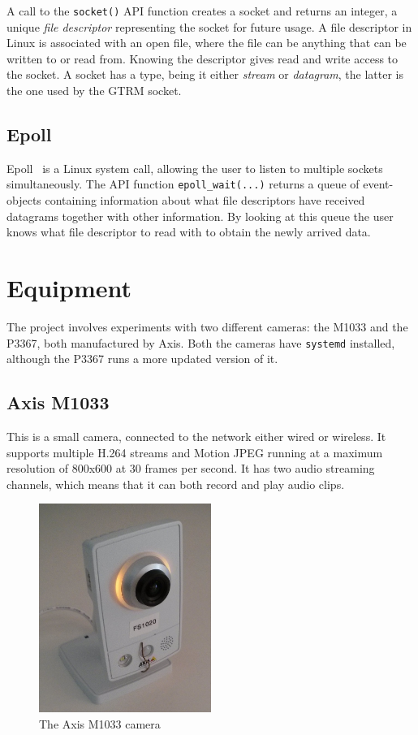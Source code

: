 \documentclass[nobiblatex]{LTHthesis}
\begin{document}
A call to the \texttt{socket()} API function creates a socket and returns 
an integer, a unique \emph{file descriptor} representing the socket for
future usage. A file descriptor in Linux is associated with an open file,
where the file can be anything that can be written to or read from. 
Knowing the descriptor gives read and write access to the socket. 
A socket has a type, being it either \emph{stream} or \emph{datagram}, 
the latter is the one used by the GTRM socket.


\subsection{Epoll}
Epoll~\cite{epoll} is a Linux system call, allowing the user to listen to multiple 
sockets simultaneously. The API function \texttt{epoll\_wait(...)} returns 
a queue of event-objects containing information about what file descriptors
have received datagrams together with other information. By looking at this 
queue the user knows what file descriptor to read with to obtain the newly
arrived data.  

\section{Equipment}
The project involves experiments with two different cameras: the M1033 and 
the P3367, both manufactured by Axis. Both the cameras have \texttt{systemd}
installed, although the P3367 runs a more updated version of it.

\subsection{Axis M1033}

This is a small camera, connected to the network either wired or wireless. 
It supports multiple H.264 streams and Motion JPEG running at a maximum
resolution of 800x600 at 30 frames per second. It has two audio streaming
channels, which means that it can both record and play audio clips. ~\cite{m1033} 

\begin{figure}[h]
    \centering
    \includegraphics[width=0.5\textwidth]{m1033}
    \caption{The Axis M1033 camera}
    \label{fig:M1033}
\end{figure}
\end{document}
